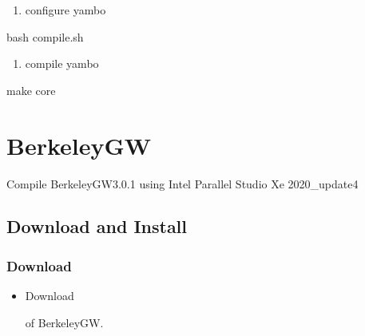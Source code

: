 \documentclass[a4paper,12pt,english]{sphinxmanual}
\begin{document}
\begin{enumerate}
%
\setcounter{enumi}{1}
\item {} 
\sphinxAtStartPar
configure yambo

\end{enumerate}

\begin{sphinxVerbatim}[commandchars=\\\{\}]
bash compile.sh
\end{sphinxVerbatim}
\begin{enumerate}
%
\setcounter{enumi}{2}
\item {} 
\sphinxAtStartPar
compile yambo

\end{enumerate}

\begin{sphinxVerbatim}[commandchars=\\\{\}]
make core
\end{sphinxVerbatim}


\section{BerkeleyGW}
\label{\detokenize{compile:berkeleygw}}
\sphinxAtStartPar
Compile BerkeleyGW\sphinxhyphen{}3.0.1 using Intel Parallel Studio Xe 2020\_update4


\subsection{Download and Install}
\label{\detokenize{compile/BerkeleyGW_3.0.1:download-and-install}}\label{\detokenize{compile/BerkeleyGW_3.0.1::doc}}

\subsubsection{Download}
\label{\detokenize{compile/BerkeleyGW_3.0.1:download}}\begin{itemize}
\item {} 
\sphinxAtStartPar
Download %
\begin{footnote}[11]\sphinxAtStartFootnote
{}
%
\end{footnote} of BerkeleyGW.

\end{itemize}
\end{document}
